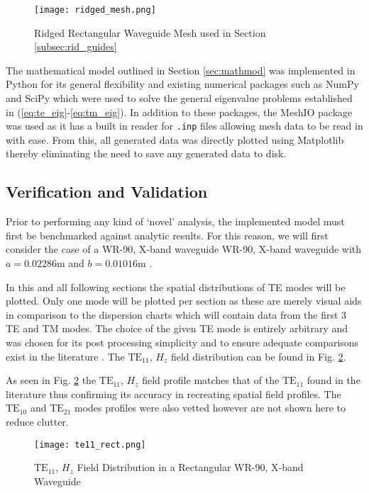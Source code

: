 \begin{figure}[h!]  
	\centering
	\texttt{[image: ridged\_mesh.png]} 
	\caption{Ridged Rectangular Waveguide Mesh used in Section \ref{subsec:rid_guides}}
	\label{fig:ridged_guide}
\end{figure}

The mathematical model outlined in Section \ref{sec:mathmod} was implemented in Python for its general flexibility and existing numerical packages such as NumPy and SciPy which were used to solve the general eigenvalue problems established in (\ref{eq:te_eig}-\ref{eq:tm_eig}). In addition to these packages, the MeshIO package was used as it has a built in reader for \verb|.inp| files allowing mesh data to be read in with ease. From this, all generated data was directly plotted using Matplotlib thereby eliminating the need to save any generated data to disk.

\subsection{Verification and Validation}
\label{subsec:vv}
Prior to performing any kind of `novel' analysis, the implemented model must first be benchmarked against analytic results. For this reason, we will first consider the case of a WR-90, X-band waveguide WR-90, X-band waveguide with $a=0.02286$m and $b=0.01016$m \cite{everythingrf}. 

In this and all following sections the spatial distributions of TE modes will be plotted. Only one mode will be plotted per section as these are merely visual aids in comparison to the dispersion charts which will contain data from the first 3 TE and TM modes. The choice of the given TE mode is entirely arbitrary and was chosen for its post processing simplicity and to ensure adequate comparisons exist in the literature \cite{pozar2011microwave}. The $\mathrm{TE}_{11}$, $H_z$ field distribution can be found in Fig. \ref{fig:reg_guide_dist}. 

As seen in Fig. \ref{fig:reg_guide_dist} the $\mathrm{TE_{11}}$, $H_z$ field profile matches that of the $\mathrm{TE}_{11}$ found in the literature thus confirming its accuracy in recreating spatial field profiles. The $\mathrm{TE}_{10}$ and $\mathrm{TE}_{21}$ modes profiles were also vetted however are not shown here to reduce clutter.

\begin{figure}[h!]  
	\centering
	\texttt{[image: te11\_rect.png]} 
	\caption{$\mathrm{TE_{11}}$, $H_z$ Field Distribution in a Rectangular WR-90, X-band Waveguide}
	\label{fig:reg_guide_dist}
\end{figure}

